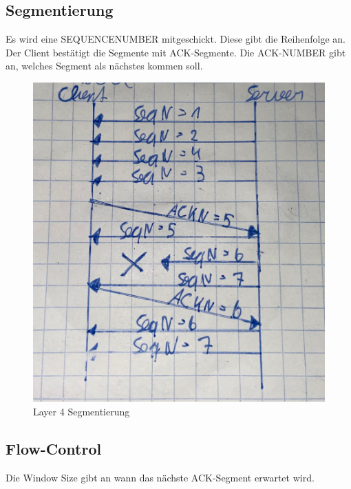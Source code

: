 \subsection*{Segmentierung}
Es wird eine SEQUENCENUMBER mitgeschickt. Diese gibt die Reihenfolge an. Der Client bestätigt die Segmente mit ACK-Segmente. Die ACK-NUMBER gibt an, welches Segment als nächstes kommen soll.
\begin{figure}[H]
	\centering
	\includegraphics[width=0.8\linewidth]{figures/l4_segment.jpeg}
	\caption{Layer 4 Segmentierung}
\end{figure}

\subsection*{Flow-Control}
Die Window Size gibt an wann das nächste ACK-Segment erwartet wird.
